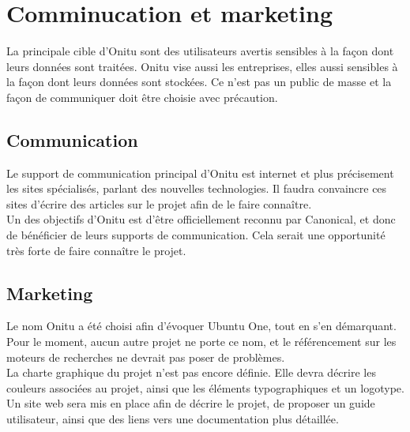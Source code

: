 \section{Comminucation et marketing}
La principale cible d'Onitu sont des utilisateurs avertis sensibles à la façon dont leurs données sont traitées. Onitu vise aussi les entreprises, elles aussi sensibles à la façon dont leurs données sont stockées. Ce n'est pas un public de masse et la façon de communiquer doit être choisie avec précaution.

\subsection{Communication}
Le support de communication principal d'Onitu est internet et plus précisement les sites spécialisés, parlant des nouvelles technologies. Il faudra convaincre ces sites d'écrire des articles sur le projet afin de le faire connaître.\\

Un des objectifs d'Onitu est d'être officiellement reconnu par Canonical, et donc de bénéficier de leurs supports de communication. Cela serait une opportunité très forte de faire connaître le projet.\\

\subsection{Marketing}
Le nom Onitu a été choisi afin d'évoquer Ubuntu One, tout en s'en démarquant. Pour le moment, aucun autre projet ne porte ce nom, et le référencement sur les moteurs de recherches ne devrait pas poser de problèmes.\\

La charte graphique du projet n'est pas encore définie. Elle devra décrire les couleurs associées au projet, ainsi que les éléments typographiques et un logotype.\\

Un site web sera mis en place afin de décrire le projet, de proposer un guide utilisateur, ainsi que des liens vers une documentation plus détaillée.
